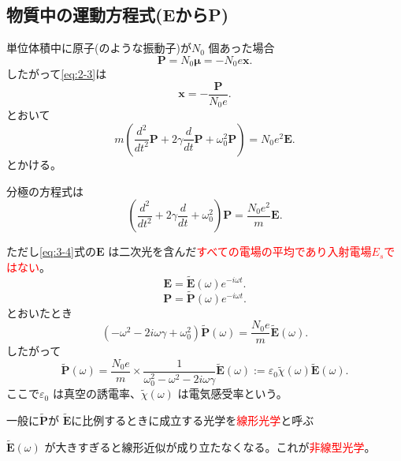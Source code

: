\documentclass[dvipdfmx,12pt]{jsarticle}
\begin{document}
\subsection{物質中の運動方程式(EからP)}
単位体積中に原子(のような振動子)が$N_0$ 個あった場合
\begin{equation}
\label{eq:3-2}
\bm{P}=N_0 \bm{\mu}=-N_0e \bm{x}
.\end{equation}
したがって\eqref{eq:2-3}は
\[
\bm{x}=-\frac{\bm{P}}{N_0e}
.\] 
とおいて
\begin{equation}
\label{eq:3-3}
	m\left( \frac{d^2}{dt^2}\bm{P}+2\gamma \frac{d}{dt}\bm{P}+\omega^2_0 \bm{P} \right) =N_0e^2\bm{E}
.\end{equation}
とかける。
\begin{tcolorbox}[colback=green!10!white]
分極の方程式は
\begin{equation}
\label{eq:3-4}
\left( \frac{d^2}{dt^2}+2\gamma \frac{d}{dt}+\omega_0^2 \right) \bm{P}=\frac{N_0e^2}{m}\bm{E}
.\end{equation}
\end{tcolorbox}
ただし\eqref{eq:3-4}式の$\bm{E}$ は二次光を含んだ\textcolor{red}{すべての電場の平均であり入射電場$E_s$ではない}。
\[
	\bm{E}=\tilde{\bm{E}}(\omega)e^{-i\omega t}
.\] 
\[
	\bm{P}=\tilde{\bm{P}}(\omega)e^{-i\omega t}
.\] 
とおいたとき
\[
	(-\omega^2-2i\omega\gamma+\omega_0^2)\tilde{\bm{P}}(\omega)=\frac{N_0e}{m}\tilde{\bm{E}}(\omega)
.\] 
したがって
\begin{equation}
\label{eq:3-5}
\tilde{\bm{P}}(\omega)=\frac{N_0e}{m}\times \frac{1}{\omega_0^2-\omega^2-2i\omega\gamma}\tilde{\bm{E}}(\omega):=\varepsilon_0 \tilde{\chi}(\omega)\tilde{\bm{E}}(\omega)
.\end{equation}
ここで$\varepsilon_0$ は真空の誘電率、$\tilde{\chi}(\omega)$ は電気感受率という。

一般に$\tilde{\bm{P}}$が $\tilde{\bm{E}}$に比例するときに成立する光学を\textcolor{red}{線形光学}と呼ぶ

$\tilde{\bm{E}}(\omega)$ が大きすぎると線形近似が成り立たなくなる。これが\textcolor{red}{非線型光学}。
\end{document}
